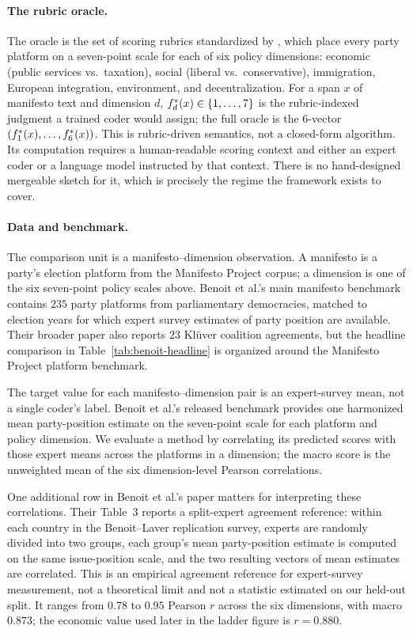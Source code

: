 \paragraph{The rubric oracle.} The oracle is the set of scoring
rubrics standardized by \citet{BenoitEtAl2025}, which place
every party platform on a seven-point scale for each of six policy
dimensions: economic (public services vs.\ taxation), social
(liberal vs.\ conservative), immigration, European integration,
environment, and decentralization. For a span $x$ of manifesto text and
dimension $d$, $f^\ast_d(x) \in \{1,\dots,7\}$ is the rubric-indexed
judgment a trained coder would assign; the full oracle is the $6$-vector
$(f^\ast_1(x),\dots,f^\ast_6(x))$. This is rubric-driven semantics, not
a closed-form algorithm. Its computation requires a human-readable
scoring context and either an expert coder or a language model
instructed by that context. There is no hand-designed mergeable sketch
for it, which is precisely the regime the framework exists to cover.

\paragraph{Data and benchmark.} The comparison unit is a
manifesto--dimension observation. A manifesto
is a party's election platform from the Manifesto Project corpus; a
dimension is one of the six seven-point policy scales above. Benoit et
al.'s main manifesto benchmark contains $235$ party platforms from
parliamentary democracies, matched to election years for which expert
survey estimates of party position are available. Their broader paper
also reports $23$ Kl\"uver coalition agreements, but the headline
comparison in Table~\ref{tab:benoit-headline} is organized around the
Manifesto Project platform benchmark.

The target value for each manifesto--dimension pair is an expert-survey
mean, not a single coder's label. Benoit et al.'s released benchmark
provides one harmonized mean party-position estimate on the seven-point
scale for each platform and policy dimension. We evaluate a method by
correlating its predicted scores with those expert means across the
platforms in a dimension; the macro score is the unweighted mean of the
six dimension-level Pearson correlations.

One additional row in Benoit et al.'s paper matters for interpreting
these correlations. Their Table~3 reports a split-expert agreement
reference: within each country in the Benoit--Laver replication survey,
experts are randomly divided into two groups, each group's mean
party-position estimate is computed on the same issue-position scale,
and the two resulting vectors of mean estimates are correlated. This is
an empirical agreement reference for expert-survey measurement, not a
theoretical limit and not a statistic estimated on our held-out
split. It ranges from $0.78$ to $0.95$ Pearson $r$ across the six
dimensions, with macro $0.873$; the economic value used later in the
ladder figure is $r = 0.880$.

